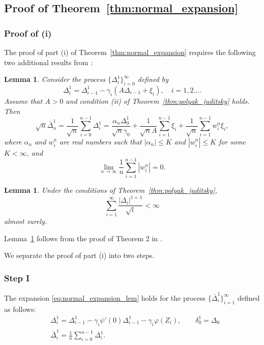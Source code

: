 \documentclass[letterpaper, 11pt]{IEEEtran}      %
\newtheorem{lem}[thm]{\bf {Lemma}}
\begin{document}
{\color{red}

\subsection{Proof of Theorem~\ref{thm:normal_expansion}
\label{proof:thm:normal_expansion}
}
\subsubsection*{Proof of (i)}
The proof of part (i) of Theorem~\ref{thm:normal_expansion} requires the following two additional results from \cite{polyak1992acceleration}:
\begin{lem}{\cite[Lem. 2]{polyak1992acceleration}}
\label{lem:Polyak_expansion}
Consider the process $\{\Delta_i^1 \}_{i=0}^\infty$ defined by
\[
\Delta^1_i = \Delta^1_{i-1} - \gamma_i (A \Delta_{i-1}+ \xi_i),\quad i=1,2\ldots.
\]
Assume that $A>0$ and condition (ii) of Theorem~\ref{thm:polyak_juditsky} holds. Then 
\begin{equation}
\label{eq:Polyak_expansion}
\sqrt{n} \bar{\Delta}_n^1 = \frac{1}{\sqrt{n}}\sum_{i=0}^{n-1} \Delta_i^1 = \frac{\alpha_n \Delta_0^1}{\sqrt{n} \gamma_0}  + \frac{1}{\sqrt{n} A} \sum_{i=1}^{n-1} \xi_i + \frac{1}{\sqrt{n}}\sum_{i=1}^{n-1} w_i^n \xi_i,
\end{equation}
where $\alpha_n$ and $w_i^n$ are real numbers such that $|\alpha_n| \leq K$ and $|w_i^n|\leq K$ for some $K< \infty$, and 
\[
\lim_{n\to \infty} \frac{1}{n} \sum_{i=1}^{n-1} |w_i^n| = 0. 
\]
\end{lem} 

\begin{lem} \label{lem:PJ_converging_sum}
Under the conditions of Theorem~\ref{thm:polyak_juditsky},
\[
\sum_{i=1}^\infty \frac{|\Delta_{i}|^{1+\lambda}}{\sqrt{i}} < \infty 
\]
almost surely. 
\end{lem}
Lemma~\ref{lem:PJ_converging_sum} follows from the proof of Theorem 2 in \cite{polyak1992acceleration}. 

We separate the proof of part (i) into two steps.
\subsubsection*{Step I}
The expansion \eqref{eq:normal_expansion_lem} holds for the process  $\{\bar{\Delta}^1_i\}_{i=1}^\infty$ defined as follows:
\begin{align} \label{eq:Polyak_expansion_lem1_alg}
& \Delta_i^1  = \Delta_{i-1}^1 - \gamma_i \psi'(0) \Delta_{i-1}^1 - \gamma_i \varphi(Z_i), \qquad
 \delta_0^1 = \Delta_0\\
& \bar{\Delta}^1_i = \frac{1}{n}\sum_{i=0}^{n-1} \Delta^1_i.
\end{align}

}
\end{document}
